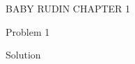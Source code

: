 \documentclass{article}
\begin{document}
	\begin{center}
		\LARGE BABY RUDIN CHAPTER 1
	\end{center}

	{\Large Problem 1}

	{\Large Solution}

	
\end{document}
